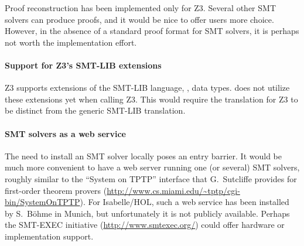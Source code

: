 Proof reconstruction has been implemented only for Z3.  Several other
SMT solvers can produce proofs, and it would be nice to offer \HOL{}
users more choice.  However, in the absence of a standard proof format
for SMT solvers, it is perhaps not worth the implementation effort.

\paragraph{Support for Z3's SMT-LIB extensions}

Z3 supports extensions of the SMT-LIB language, \eg, data types.
 does not utilize these extensions yet when calling Z3.
This would require the translation for Z3 to be distinct from the
generic SMT-LIB translation.

\paragraph{SMT solvers as a web service}

The need to install an SMT solver locally poses an entry barrier.  It
would be much more convenient to have a web server running one (or
several) SMT solvers, roughly similar to the ``System on TPTP''
interface that G.~Sutcliffe provides for first-order theorem provers
(\url{http://www.cs.miami.edu/~tptp/cgi-bin/SystemOnTPTP}).  For
Isabelle/HOL, such a web service has been installed by S.~B{\"o}hme in
Munich, but unfortunately it is not publicly available.  Perhaps the
SMT-EXEC initiative (\url{http://www.smtexec.org/}) could offer
hardware or implementation support.


